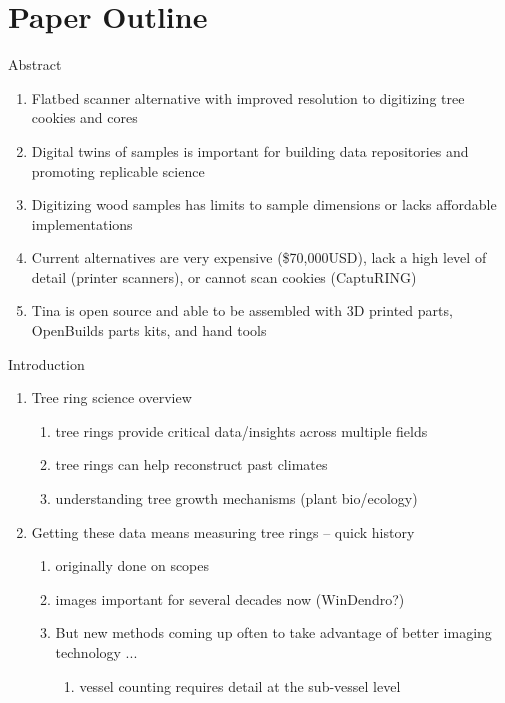\documentclass{article}
\begin{document}
\section {Paper Outline}
\begin{outline}[enumerate]

\1 Abstract
\begin{enumerate}
	\item Flatbed scanner alternative with improved resolution to digitizing tree cookies and cores
	\item Digital twins of samples is important for building data repositories and promoting replicable science
	\item Digitizing wood samples has limits to sample dimensions or lacks affordable implementations
	\item Current alternatives are very expensive (\$70,000USD), lack a high level of detail (printer scanners), or cannot scan cookies (CaptuRING)
	\item Tina is open source and able to be assembled with 3D printed parts, OpenBuilds parts kits, and hand tools %
\end{enumerate}
\item Introduction
	\begin{enumerate}
	\item Tree ring science overview
		\begin{enumerate}
		\item tree rings provide critical data/insights across multiple fields
		\item tree rings can help reconstruct past climates 
		\item understanding tree growth mechanisms (plant bio/ecology)
		\end{enumerate}
	\item Getting these data means measuring tree rings -- quick history
		\begin{enumerate}
		\item originally done on scopes
		\item images important for several decades now (WinDendro?) 
		\item But new methods coming up often to take advantage of better imaging technology ... 
		\begin{enumerate}
			\item vessel counting requires detail at the sub-vessel level %

\end{enumerate}
\end{enumerate}
\end{enumerate}
\end{outline}
\end{document}
